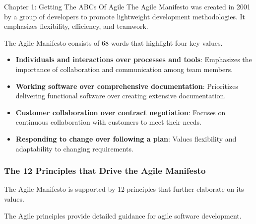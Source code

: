 \begin{notes}{Chapter 1: Getting The ABCs Of Agile}
    The Agile Manifesto was created in 2001 by a group of developers to promote lightweight development methodologies. It emphasizes flexibility, efficiency, and teamwork.
    
    \begin{highlight}
    
        The Agile Manifesto consists of 68 words that highlight four key values.
        
        \begin{itemize}
            \item \textbf{Individuals and interactions over processes and tools}: Emphasizes the importance of collaboration and communication among team members.
            \item \textbf{Working software over comprehensive documentation}: Prioritizes delivering functional software over creating extensive documentation.
            \item \textbf{Customer collaboration over contract negotiation}: Focuses on continuous collaboration with customers to meet their needs.
            \item \textbf{Responding to change over following a plan}: Values flexibility and adaptability to changing requirements.
        \end{itemize}
    
    \end{highlight}
    
    \subsubsection*{The 12 Principles that Drive the Agile Manifesto}
    
    The Agile Manifesto is supported by 12 principles that further elaborate on its values.
    
    \begin{highlight}
    
        The Agile principles provide detailed guidance for agile software development.
        

\end{highlight}
\end{notes}
